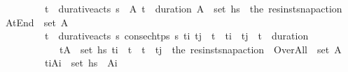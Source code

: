 \begin{isabellebody}
\ \ \ \ \ \ \ \ {\isachardoublequoteopen}{\isacharparenleft}{\kern0pt}t\isactrlsub {\isasympi}{\isacharcomma}{\kern0pt}{\isasympi}{\isacharparenright}{\kern0pt}\ {\isasymin}\ durative{\isacharunderscore}{\kern0pt}acts\ {\isasympi}s\ {\isasymLongrightarrow}\ {\isasymexists}A{\isachardot}{\kern0pt}\ {\isacharparenleft}{\kern0pt}t\isactrlsub {\isasympi}\ {\isacharplus}{\kern0pt}\ {\isacharparenleft}{\kern0pt}duration\ {\isasympi}{\isacharparenright}{\kern0pt}{\isacharcomma}{\kern0pt}A{\isacharparenright}{\kern0pt}\ {\isasymin}\ set\ hs\ {\isasymand}\ the\ {\isacharparenleft}{\kern0pt}res{\isacharunderscore}{\kern0pt}inst{\isacharunderscore}{\kern0pt}snap{\isacharunderscore}{\kern0pt}action\ {\isasympi}\ At{\isacharunderscore}{\kern0pt}End{\isacharparenright}{\kern0pt}\ {\isasymin}\ set\ A{\isachardoublequoteclose}\isanewline
\ \ \ \ \ \ \ \ {\isachardoublequoteopen}{\isasymlbrakk}{\isacharparenleft}{\kern0pt}t\isactrlsub {\isasympi}{\isacharcomma}{\kern0pt}{\isasympi}{\isacharparenright}{\kern0pt}\ {\isasymin}\ durative{\isacharunderscore}{\kern0pt}acts\ {\isasympi}s{\isacharsemicolon}{\kern0pt}\ consec{\isacharunderscore}{\kern0pt}htps\ {\isasympi}s\ t\isactrlsub i\ t\isactrlsub j\ {\isacharsemicolon}{\kern0pt}\ t\isactrlsub {\isasympi}\ {\isasymle}\ t\isactrlsub i\ {\isacharsemicolon}{\kern0pt}\ t\isactrlsub j\ {\isasymle}\ t\isactrlsub {\isasympi}\ {\isacharplus}{\kern0pt}\ {\isacharparenleft}{\kern0pt}duration\ {\isasympi}{\isacharparenright}{\kern0pt}{\isasymrbrakk}\isanewline
\ \ \ \ \ \ \ \ \ \ {\isasymLongrightarrow}\ {\isasymexists}{\isacharparenleft}{\kern0pt}t{\isacharprime}{\kern0pt}{\isacharcomma}{\kern0pt}A{\isacharparenright}{\kern0pt}\ {\isasymin}\ set\ hs{\isachardot}{\kern0pt}\ t\isactrlsub i\ {\isacharless}{\kern0pt}\ t{\isacharprime}{\kern0pt}\ {\isasymand}\ t{\isacharprime}{\kern0pt}\ {\isacharless}{\kern0pt}\ t\isactrlsub j\ {\isasymand}\ the\ {\isacharparenleft}{\kern0pt}res{\isacharunderscore}{\kern0pt}inst{\isacharunderscore}{\kern0pt}snap{\isacharunderscore}{\kern0pt}action\ {\isasympi}\ Over{\isacharunderscore}{\kern0pt}All{\isacharparenright}{\kern0pt}\ {\isasymin}\ set\ A{\isachardoublequoteclose}\isanewline
\ \ \ \ \ \ \ \ {\isachardoublequoteopen}{\isacharparenleft}{\kern0pt}t\isactrlsub i{\isacharcomma}{\kern0pt}A\isactrlsub i{\isacharparenright}{\kern0pt}\ {\isasymin}\ set\ hs\ {\isasymLongrightarrow}\ A\isactrlsub i\ {\isasymnoteq}\ {\isacharbrackleft}{\kern0pt}{\isacharbrackright}{\kern0pt}{\isachardoublequoteclose}\isanewline

\end{isabellebody}
